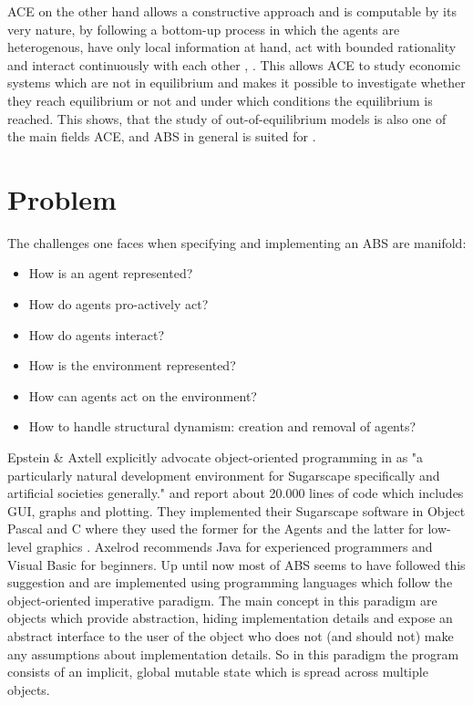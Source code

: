 ACE on the other hand allows a constructive approach and is computable by its very nature, by following a bottom-up process in which the agents are heterogenous, have only local information at hand, act with bounded rationality and interact continuously with each other \cite{tesfatsion_modeling_2017}, \cite{kirman_complex_2010}. This allows ACE to study economic systems which are not in equilibrium and makes it possible to investigate whether they reach equilibrium or not and under which conditions the equilibrium is reached. This shows, that the study of out-of-equilibrium models is also one of the main fields ACE, and ABS in general is suited for \cite{epstein_generative_2012}.

\section{Problem}
The challenges one faces when specifying and implementing an ABS are manifold:

\begin{itemize}
	\item How is an agent represented?
	\item How do agents pro-actively act?
	\item How do agents interact?
	\item How is the environment represented?
	\item How can agents act on the environment?
	\item How to handle structural dynamism: creation and removal of agents?
\end{itemize}

Epstein \& Axtell explicitly advocate object-oriented programming in \cite{epstein_growing_1996} as "a particularly natural development environment for Sugarscape specifically and artificial societies generally." and report about 20.000 lines of code which includes GUI, graphs and plotting. They implemented their Sugarscape software in Object Pascal and C where they used the former for the Agents and the latter for low-level graphics \cite{axtell_aligning_1996}. Axelrod \cite{axelrod_advancing_1997} recommends Java for experienced programmers and Visual Basic for beginners. Up until now most of ABS seems to have followed this suggestion and are implemented using programming languages which follow the object-oriented imperative paradigm.
The main concept in this paradigm are objects which provide abstraction, hiding implementation details and expose an abstract interface to the user of the object who does not (and should not) make any assumptions about implementation details. So in this paradigm the program consists of an implicit, global mutable state which is spread across multiple objects. 

